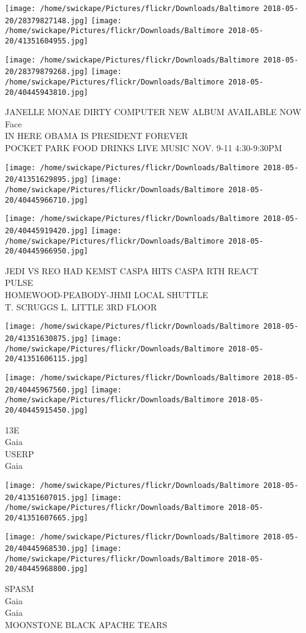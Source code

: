 \documentclass[10pt,letterpaper]{article}
\begin{document}
\texttt{[image: /home/swickape/Pictures/flickr/Downloads/Baltimore 2018-05-20/28379827148.jpg]}
\texttt{[image: /home/swickape/Pictures/flickr/Downloads/Baltimore 2018-05-20/41351604955.jpg]}

\texttt{[image: /home/swickape/Pictures/flickr/Downloads/Baltimore 2018-05-20/28379879268.jpg]}
\texttt{[image: /home/swickape/Pictures/flickr/Downloads/Baltimore 2018-05-20/40445943810.jpg]}

JANELLE MONAE DIRTY COMPUTER NEW ALBUM AVAILABLE NOW\\
Face\\
IN HERE OBAMA IS PRESIDENT FOREVER\\
POCKET PARK FOOD DRINKS LIVE MUSIC NOV. 9{-}11 4:30{-}9:30PM
\pagebreak

\texttt{[image: /home/swickape/Pictures/flickr/Downloads/Baltimore 2018-05-20/41351629895.jpg]}
\texttt{[image: /home/swickape/Pictures/flickr/Downloads/Baltimore 2018-05-20/40445966710.jpg]}

\texttt{[image: /home/swickape/Pictures/flickr/Downloads/Baltimore 2018-05-20/40445919420.jpg]}
\texttt{[image: /home/swickape/Pictures/flickr/Downloads/Baltimore 2018-05-20/40445966950.jpg]}

JEDI VS REO HAD KEMST CASPA HITS CASPA RTH REACT\\
PULSE\\
HOMEWOOD{-}PEABODY{-}JHMI LOCAL SHUTTLE\\
T. SCRUGGS L. LITTLE 3RD FLOOR
\pagebreak

\texttt{[image: /home/swickape/Pictures/flickr/Downloads/Baltimore 2018-05-20/41351630875.jpg]}
\texttt{[image: /home/swickape/Pictures/flickr/Downloads/Baltimore 2018-05-20/41351606115.jpg]}

\texttt{[image: /home/swickape/Pictures/flickr/Downloads/Baltimore 2018-05-20/40445967560.jpg]}
\texttt{[image: /home/swickape/Pictures/flickr/Downloads/Baltimore 2018-05-20/40445915450.jpg]}

13E\\
Gaia\\
USERP\\
Gaia
\pagebreak

\texttt{[image: /home/swickape/Pictures/flickr/Downloads/Baltimore 2018-05-20/41351607015.jpg]}
\texttt{[image: /home/swickape/Pictures/flickr/Downloads/Baltimore 2018-05-20/41351607665.jpg]}

\texttt{[image: /home/swickape/Pictures/flickr/Downloads/Baltimore 2018-05-20/40445968530.jpg]}
\texttt{[image: /home/swickape/Pictures/flickr/Downloads/Baltimore 2018-05-20/40445968800.jpg]}

SPASM\\
Gaia\\
Gaia\\
MOONSTONE BLACK APACHE TEARS
\pagebreak
\end{document}
